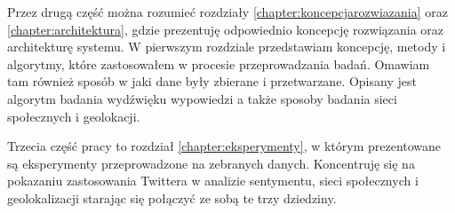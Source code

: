 Przez drugą część można rozumieć rozdziały \ref{chapter:koncepcjarozwiazania}
oraz \ref{chapter:architektura}, gdzie prezentuję odpowiednio koncepcję
rozwiązania oraz architekturę systemu. W pierwszym rozdziale
przedstawiam koncepcję, metody i algorytmy, które zastosowałem w procesie
przeprowadzania badań. Omawiam tam również sposób w jaki dane były zbierane
i przetwarzane. Opisany jest algorytm badania wydźwięku wypowiedzi a także
sposoby badania sieci społecznych i geolokacji.

Trzecia część pracy to rozdział \ref{chapter:eksperymenty}, w którym
prezentowane są eksperymenty przeprowadzone na zebranych danych.
Koncentruję się na pokazaniu zastosowania Twittera w analizie
sentymentu, sieci społecznych i geolokalizacji starając się połączyć
ze sobą te trzy dziedziny.

